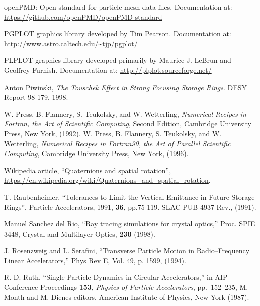 \begin{thebibliography}{XXXXXXX99}
openPMD: Open standard for particle-mesh data files. Documentation at:
\hfill\break
\hspace*{0.3in}
\url{https://github.com/openPMD/openPMD-standard}

PGPLOT graphics library developed by Tim Pearson. Documentation at:
\hfill\break
\hspace*{0.3in}
\url{http://www.astro.caltech.edu/~tjp/pgplot/}

PLPLOT graphics library developed primarily by Maurice J. LeBrun and Geoffrey Furnish. Documentation at:
\hfill\break
\hspace*{0.3in}
\url{http://plplot.sourceforge.net/}

Anton Piwinski, \emph{The Touschek Effect in Strong Focusing Storage Rings}.
DESY Report 98-179, 1998.

W. Press, B. Flannery, S. Teukolsky, and W. Wetterling, {\em Numerical
Recipes in Fortran, the Art of Scientific Computing}, Second Edition,
Cambridge University Press, New York, (1992). \hfill \break
W. Press, B. Flannery, S. Teukolsky, and W. Wetterling, {\em Numerical
Recipes in Fortran90, the Art of Parallel Scientific Computing}, 
Cambridge University Press, New York, (1996).

Wikipedia article, ``Quaternions and spatial rotation'',
\hfill\break
\hspace*{20pt} 
\url{https://en.wikipedia.org/wiki/Quaternions_and_spatial_rotation}.

T. Raubenheimer,
``Tolerances to Limit the Vertical Emittance in Future Storage Rings'', 
Particle Accelerators, 1991, {\bf 36}, pp.75-119. 
SLAC-PUB-4937 Rev., (1991).

Manuel Sanchez del Rio, ``Ray tracing simulations for crystal optics,''
Proc. SPIE 3448, Crystal and Multilayer Optics, {\bf 230} (1998). 

J. Rosenzweig and L. Serafini, ``Transverse Particle Motion in
Radio--Frequency Linear Accelerators,'' Phys Rev E, Vol. 49, p. 1599,
(1994).

R. D. Ruth, ``Single-Particle Dynamics in
Circular Accelerators,'' in AIP Conference Proceedings {\bf 153}, {\em
Physics of Particle Accelerators}, pp.~152--235, M. Month and M. Dienes editors,
American Institute of Physics, New York (1987).


\end{thebibliography}
